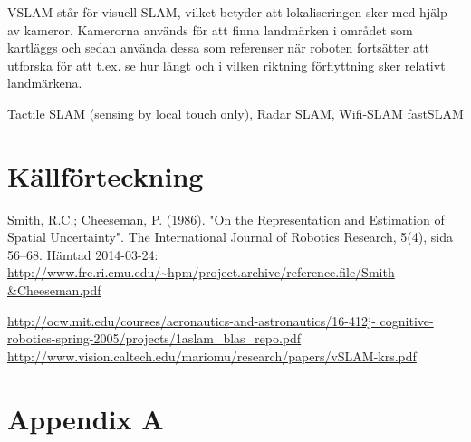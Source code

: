 \documentclass[a4paper,12pt,fleqn]{article} \usepackage{fixltx2e}
\begin{document}
VSLAM står för visuell SLAM, vilket betyder att lokaliseringen sker med
hjälp av kameror. Kamerorna används för att finna landmärken i området
som kartläggs och sedan använda dessa som referenser när roboten
fortsätter att utforska för att t.ex. se hur långt och i vilken riktning
förflyttning sker relativt landmärkena.


Tactile SLAM (sensing by local touch only), Radar SLAM, Wifi-SLAM
fastSLAM

\newpage \section{Källförteckning} Smith, R.C.; Cheeseman, P. (1986).
"On the Representation and Estimation of Spatial Uncertainty". The
International Journal of Robotics Research, 5(4), sida 56–68. Hämtad
2014-03-24:
\url{http://www.frc.ri.cmu.edu/~hpm/project.archive/reference.file/Smith
&Cheeseman.pdf}

\url{http://ocw.mit.edu/courses/aeronautics-and-astronautics/16-412j-
cognitive-robotics-spring-2005/projects/1aslam_blas_repo.pdf}
\url{http://www.vision.caltech.edu/mariomu/research/papers/vSLAM-krs.pdf
}

% 
\newpage \appendix \pagestyle{empty}
 \section{Appendix A}
\end{document}
